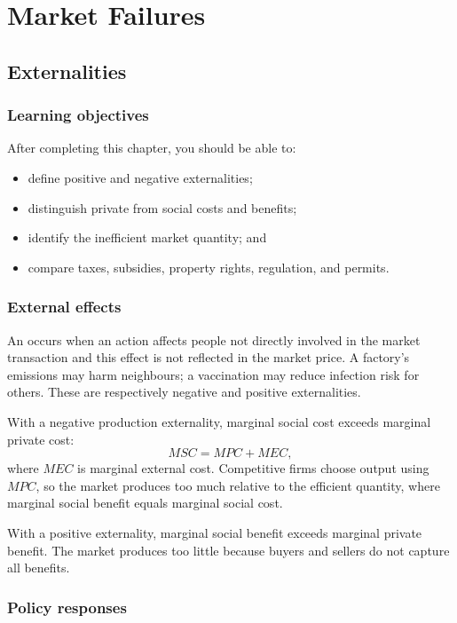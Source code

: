 \part{Market Failures}

\chapter{Externalities}
\label{chap:externalities}

\section{Learning objectives}

After completing this chapter, you should be able to:
\begin{itemize}
  \item define positive and negative externalities;
  \item distinguish private from social costs and benefits;
  \item identify the inefficient market quantity; and
  \item compare taxes, subsidies, property rights, regulation, and permits.
\end{itemize}

\section{External effects}

An  occurs when an action affects people not directly involved in the market transaction and this effect is not reflected in the market price. A factory's emissions may harm neighbours; a vaccination may reduce infection risk for others. These are respectively negative and positive externalities.

With a negative production externality, marginal social cost exceeds marginal private cost:
\[
MSC=MPC+MEC,
\]
where $MEC$ is marginal external cost. Competitive firms choose output using $MPC$, so the market produces too much relative to the efficient quantity, where marginal social benefit equals marginal social cost.

With a positive externality, marginal social benefit exceeds marginal private benefit. The market produces too little because buyers and sellers do not capture all benefits.

\section{Policy responses}

